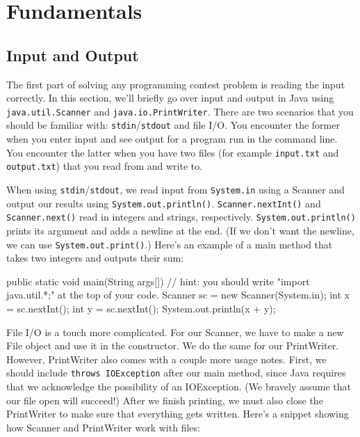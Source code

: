 \chapter{Fundamentals}

\section{Input and Output}

The first part of solving any programming contest problem is reading the input correctly. In this section, we'll briefly go over input and output in Java using \texttt{java.util.Scanner} and \texttt{java.io.PrintWriter}. There are two scenarios that you should be familiar with: \texttt{stdin}/\texttt{stdout} and file I/O. You encounter the former when you enter input and see output for a program run in the command line. You encounter the latter when you have two files (for example \texttt{input.txt} and \texttt{output.txt}) that you read from and write to.

When using \texttt{stdin}/\texttt{stdout}, we read input from \texttt{System.in} using a Scanner and output our results using \texttt{System.out.println()}. \texttt{Scanner.nextInt()} and \texttt{Scanner.next()} read in integers and strings, respectively. \texttt{System.out.println()} prints its argument and adds a newline at the end. (If we don't want the newline, we can use \texttt{System.out.print()}.) Here's an example of a main method that takes two integers and outputs their sum:

\begin{mylstlisting}
public static void main(String args[]) {
  // hint: you should write "import java.util.*;" at the top of your code.
  Scanner sc = new Scanner(System.in);
  int x = sc.nextInt();
  int y = sc.nextInt();
  System.out.println(x + y);
}
\end{mylstlisting}

File I/O is a touch more complicated. For our Scanner, we have to make a new File object and use it in the constructor. We do the same for our PrintWriter. However, PrintWriter also comes with a couple more usage notes. First, we should include \texttt{throws IOException} after our main method, since Java requires that we acknowledge the possibility of an IOException. (We bravely assume that our file open will succeed!) After we finish printing, we must also close the PrintWriter to make sure that everything gets written. Here's a snippet showing how Scanner and PrintWriter work with files: 

